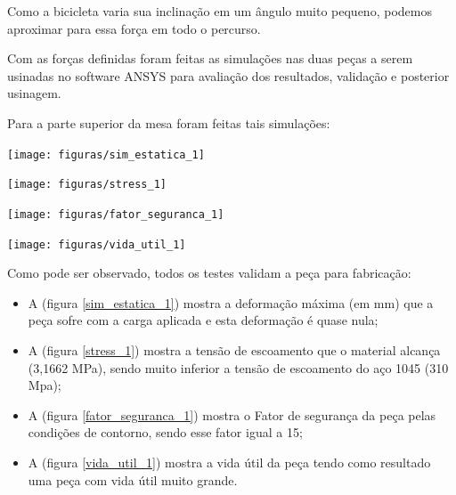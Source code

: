     Como a bicicleta varia sua inclinação em um ângulo muito pequeno, podemos aproximar para essa força em todo o percurso.

    Com as forças definidas foram feitas as simulações nas duas peças a serem usinadas no software ANSYS para avaliação dos resultados, validação e posterior usinagem.

    Para a parte superior da mesa foram feitas tais simulações:

     \begin{center}
    	\texttt{[image: figuras/sim\_estatica\_1]}
        \label{sim_estatica_1}
    \end{center}
    
     \begin{center}
    	\texttt{[image: figuras/stress\_1]}
        \label{stress_1}
    \end{center}

     \begin{center}
    	\texttt{[image: figuras/fator\_seguranca\_1]}
        \label{fator_seguranca_1}
    \end{center}

     \begin{center}
    	\texttt{[image: figuras/vida\_util\_1]}
        \label{vida_util_1}
    \end{center}

    Como pode ser observado, todos os testes validam a peça para fabricação:

    \begin{itemize}
        \item A (figura \ref{sim_estatica_1}) mostra a deformação máxima (em mm) que a peça sofre com a carga aplicada e esta deformação é quase nula;
        \item A (figura \ref{stress_1}) mostra a tensão de escoamento que o material alcança (3,1662 MPa), sendo muito inferior a tensão de escoamento do aço 1045 (310 Mpa);
        \item A (figura \ref{fator_seguranca_1}) mostra o Fator de segurança da peça pelas condições de contorno, sendo esse fator igual a 15;
        \item A (figura \ref{vida_util_1}) mostra a vida útil da peça tendo como resultado uma peça com vida útil muito grande.
    \end{itemize}
  
